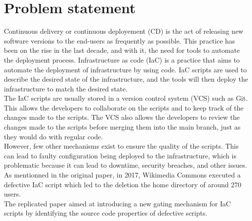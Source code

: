 
\section{Problem statement}
Continuous delivery or continuous deployement (CD) is the act of releasing new software versions to the end-users as frequently as possible. This practice has been on the rise in the last decade, and with it, the need for tools to automate the deployment process. Infrastructure as code (IaC) is a practice that aims to automate the deployment of infrastructure by using code. IaC scripts are used to describe the desired state of the infrastructure, and the tools will then deploy the infrastructure to match the desired state. \\
The IaC scripts are usually stored in a version control system (VCS) such as Git. This allows the developers to collaborate on the scripts and to keep track of the changes made to the scripts. The VCS also allows the developers to review the changes made to the scripts before merging them into the main branch, just as they would do with regular code. \\
However, few other mechanisms exist to ensure the quality of the scripts. This can lead to faulty configuration being deployed to the infrastructure, which is problematic because it can lead to downtime, security breaches, and other issues. As mentionned in the original paper, in 2017, Wikimedia Commons executed a defective IaC script which led to the deletion the home directory of around 270 users. \\
The replicated paper aimed at introducing a new gating mechanism for IaC scripts by identifying the source code properties of defective scripts.



